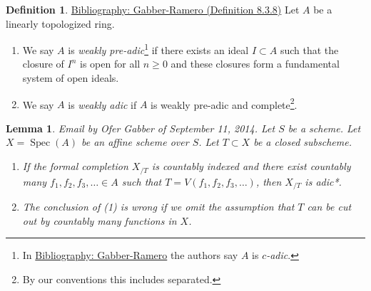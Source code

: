 \documentclass{amsart}
\newenvironment{reference}{\comment}{\endcomment}
\theoremstyle{plain}
\newtheorem{lemma}[subsection]{Lemma}
\theoremstyle{definition}
\newtheorem{definition}[subsection]{Definition}
\theoremstyle{remark}
\numberwithin{equation}{subsection}
\def\Spec{\mathop{\mathrm{Spec}}}
\begin{document}
\begin{definition}
\label{definition-weakly-adic}
\begin{reference}
\href{https://stacks.math.columbia.edu/bibliography}{Bibliography: Gabber-Ramero (Definition 8.3.8)}
\end{reference}
Let $A$ be a linearly topologized ring.
\begin{enumerate}
\item We say $A$ is {\it weakly pre-adic}\footnote{In \href{https://stacks.math.columbia.edu/bibliography}{Bibliography: Gabber-Ramero} the
authors say $A$ is {\it $c$-adic}.} if there exists an ideal
$I \subset A$ such that the closure of $I^n$ is open for all $n \geq 0$
and these closures form a fundamental system of open ideals.
\item We say $A$ is {\it weakly adic} if $A$ is weakly pre-adic
and complete\footnote{By our conventions this includes separated.}.
\end{enumerate}
\end{definition}

\begin{lemma}
\label{lemma-completion-countably-indexed}
\begin{reference}
Email by Ofer Gabber of September 11, 2014.
\end{reference}
Let $S$ be a scheme. Let $X = \Spec(A)$ be an affine scheme over $S$.
Let $T \subset X$ be a closed subscheme.
\begin{enumerate}
\item If the formal completion $X_{/T}$ is countably indexed
and there exist countably many $f_1, f_2, f_3, \ldots \in A$ such that
$T = V(f_1, f_2, f_3, \ldots)$, then $X_{/T}$ is adic*.
\item The conclusion of (1) is wrong if we omit the assumption that
$T$ can be cut out by countably many functions in $X$.
\end{enumerate}
\end{lemma}
\end{document}
